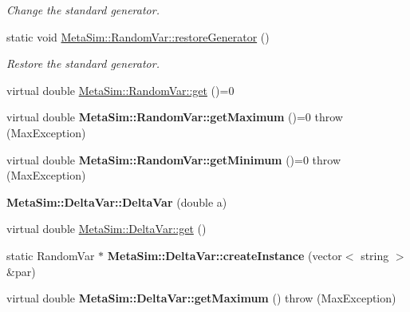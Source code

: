 \begin{DoxyCompactItemize}
\begin{DoxyCompactList}\small\item\em Change the standard generator. \end{DoxyCompactList}\item 
static void \hyperlink{group__metasim__random_ga606bcdbc13861b87d0857a1af29ad07e}{Meta\+Sim\+::\+Random\+Var\+::restore\+Generator} ()\hypertarget{group__metasim__random_ga606bcdbc13861b87d0857a1af29ad07e}{}\label{group__metasim__random_ga606bcdbc13861b87d0857a1af29ad07e}

\begin{DoxyCompactList}\small\item\em Restore the standard generator. \end{DoxyCompactList}\item 
virtual double \hyperlink{group__metasim__random_ga9299062bad4e4aa77c9cef1f687f964b}{Meta\+Sim\+::\+Random\+Var\+::get} ()=0
\item 
virtual double {\bfseries Meta\+Sim\+::\+Random\+Var\+::get\+Maximum} ()=0  throw (\+Max\+Exception)\hypertarget{group__metasim__random_ga26e8be376a727f8aec6c3f9500d5c800}{}\label{group__metasim__random_ga26e8be376a727f8aec6c3f9500d5c800}

\item 
virtual double {\bfseries Meta\+Sim\+::\+Random\+Var\+::get\+Minimum} ()=0  throw (\+Max\+Exception)\hypertarget{group__metasim__random_gaf1ac06f9877c567738b579389295a9c5}{}\label{group__metasim__random_gaf1ac06f9877c567738b579389295a9c5}

\item 
{\bfseries Meta\+Sim\+::\+Delta\+Var\+::\+Delta\+Var} (double a)\hypertarget{group__metasim__random_ga1f1bad918b0d8198917bca88e0a68ee0}{}\label{group__metasim__random_ga1f1bad918b0d8198917bca88e0a68ee0}

\item 
virtual double \hyperlink{group__metasim__random_ga6657b65ec15929668867fbf873c4d801}{Meta\+Sim\+::\+Delta\+Var\+::get} ()
\item 
static Random\+Var $\ast$ {\bfseries Meta\+Sim\+::\+Delta\+Var\+::create\+Instance} (vector$<$ string $>$ \&par)\hypertarget{group__metasim__random_gaba7c96fe18b4fb173fb1507c804b47cd}{}\label{group__metasim__random_gaba7c96fe18b4fb173fb1507c804b47cd}

\item 
virtual double {\bfseries Meta\+Sim\+::\+Delta\+Var\+::get\+Maximum} ()  throw (\+Max\+Exception)\hypertarget{group__metasim__random_gaee9cbecedd8a4145d7dccfb512b60d11}{}\label{group__metasim__random_gaee9cbecedd8a4145d7dccfb512b60d11}


\end{DoxyCompactItemize}
